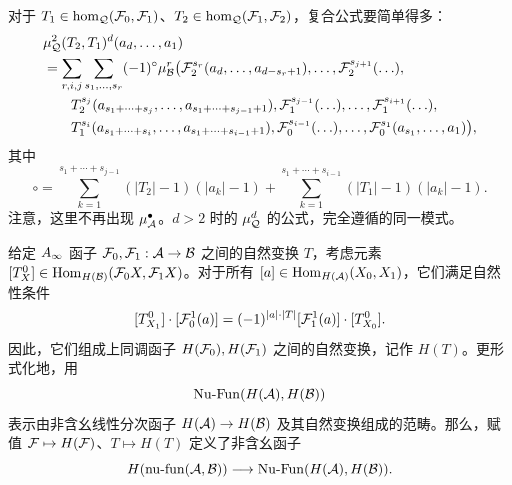 对于 $T_1\in\hom_{\mathcal Q}(\mathcal F_0,\mathcal F_1)$、$T_2\in\hom_{\mathcal Q}(\mathcal F_1,\mathcal F_2)$，复合公式要简单得多：
\begin{equation}\label{eq:1.9}
\begin{aligned}
&\mu^2_{\mathcal Q}(T_2,T_1)^d(a_d,\ldots,a_1)\\
&=\sum_{r,i,j}\sum_{s_1,\ldots,s_r}(-1)^{\circ}\mu^r_{\mathcal B}\bigl(
\mathcal F_2^{s_r}(a_d,\ldots,a_{d-s_r+1}),\ldots,\mathcal F_2^{s_{j+1}}(\ldots),\\
&\qquad T_2^{s_j}(a_{s_1+\cdots+s_j},\ldots,a_{s_1+\cdots+s_{j-1}+1}),
\mathcal F_1^{s_{j-1}}(\ldots),\ldots,\mathcal F_1^{s_{i+1}}(\ldots),\\
&\qquad T_1^{s_i}(a_{s_1+\cdots+s_i},\ldots,a_{s_1+\cdots+s_{i-1}+1}),
\mathcal F_0^{s_{i-1}}(\ldots),\ldots,\mathcal F_0^{s_1}(a_{s_1},\ldots,a_1)\bigr),
\end{aligned}
\end{equation}
其中
\[
\circ=\sum_{k=1}^{s_1+\cdots+s_{j-1}}(|T_2|-1)(|a_k|-1)
+\sum_{k=1}^{s_1+\cdots+s_{i-1}}(|T_1|-1)(|a_k|-1).
\]
注意，这里不再出现 $\mu^{\bullet}_{\mathcal A}$。$d>2$ 时的 $\mu^d_{\mathcal Q}$ 的公式，完全遵循的同一模式。

给定 $A_\infty$ 函子 $\mathcal F_0,\mathcal F_1:\mathcal A\to\mathcal B$ 之间的自然变换 $T$，考虑元素 $[T_X^0]\in\operatorname{Hom}_{H(\mathcal B)}(\mathcal F_0X,\mathcal F_1X)$。对于所有 $[a]\in\operatorname{Hom}_{H(\mathcal A)}(X_0,X_1)$，它们满足自然性条件
\[
[T^0_{X_1}]\cdot[\mathcal F_0^1(a)]=(-1)^{|a|\cdot|T|}[\mathcal F_1^1(a)]\cdot[T^0_{X_0}].
\]
因此，它们组成上同调函子 $H(\mathcal F_0),H(\mathcal F_1)$ 之间的自然变换，记作 $H(T)$。更形式化地，用
\[
\operatorname{Nu\text{-}Fun}(H(\mathcal A),H(\mathcal B))
\]
表示由非含幺线性分次函子 $H(\mathcal A)\to H(\mathcal B)$ 及其自然变换组成的范畴。那么，赋值 $\mathcal F\mapsto H(\mathcal F)$、$T\mapsto H(T)$ 定义了非含幺函子
\begin{equation}\label{eq:1.10}
H(\operatorname{nu\text{-}fun}(\mathcal A,\mathcal B))\longrightarrow\operatorname{Nu\text{-}Fun}(H(\mathcal A),H(\mathcal B)).
\end{equation}

\clearpage
